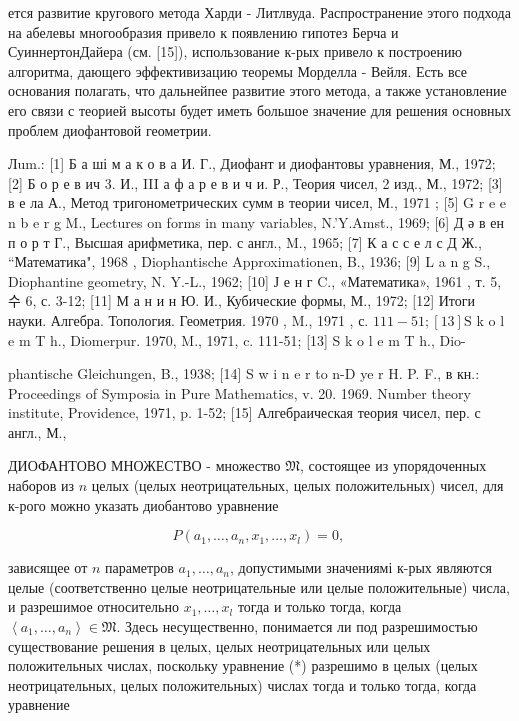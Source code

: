 \documentclass[10pt]{article}
\begin{document}
ется развитие кругового метода Харди - Литлвуда. Распространение этого подхода на абелевы многообразия привело к появлению гипотез Берча и СуиннертонДайера (см. [15]), использование к-рых привело к построению алгоритма, дающего эффективизацию теоремы Морделла - Вейля. Есть все основания полагать, что дальнейпее развитие этого метода, а также установление его связи с теорией высоты будет иметь большое значение для решения основных проблем диофантовой геометрии.



Лum.: [1] Б а ші м а к о в а И. Г., Диофант и диофантовы уравнения, М., 1972; [2] Б о р е в ич 3. И., III а ф а р е в и ч и. Р., Теория чисел, 2 изд., М., 1972; [3] в е ла А., Метод тригонометрических сумм в теории чисел, М., 1971 ; [5] G r e e n b e r g M., Lectures on forms in many variables, N.'Y.Amst., 1969; [6] Д ә в ен п о р т Г., Высшая арифметика, пер. с англ., M., 1965; [7] К а с с е л с Д Ж., “Математика", 1968 , Diophantische Approximationen, B., 1936; [9] L a n g S., Diophantine geometry, N. Y.-L., 1962; [10] Ј е н г C., «Математика», 1961 , т. 5, 수 6, с. 3-12; [11] М а н и н Ю. И., Кубические формы, М., 1972; [12] Итоги науки. Алгебра. Топология. Геометрия. 1970 , M., 1971 , с. $111-51 ;[13] \mathrm{S}$ k o l e m T h., Diomerpur. 1970, M., 1971, c. 111-51; [13] S k o l e m T h., Dio-

phantische Gleichungen, B., 1938; [14] S w i n e r to n-D ye r H. P. F., в кн.: Proceedings of Symposia in Pure Mathematics, v. 20. 1969. Number theory institute, Providence, 1971, p. 1-52; [15] Алгебраическая теория чисел, пер. с англ., М.,



ДИОФАНТОВО МНОЖЕСТВО - множество $\mathfrak{M}$, состоящее из упорядоченных наборов из $n$ целых (целых неотрицательных, целых положительных) чисел, для к-рого можно указать диобантово уравнение



\[

P\left(a_{1}, \ldots, a_{n}, x_{1}, \ldots, x_{l}\right)=0 \text {, }

\]



зависящее от $n$ параметров $a_{1}, \ldots, a_{n}$, допустимыми значениямі к-рых являются целые (соответственно целые неотрицательные или целые положительные) числа, и разрешимое относительно $x_{1}, \ldots, x_{l}$ тогда и только тогда, когда $\left\langle a_{1}, \ldots, a_{n}\right\rangle \in \mathfrak{M}$. Здесь несущественно, понимается ли под разрешимостью существование решения в целых, целых неотрицательных или целых положительных числах, поскольку уравнение (*) разрешимо в целых (целых неотрицательных, целых положительных) числах тогда и только тогда, когда уравнение
\end{document}

